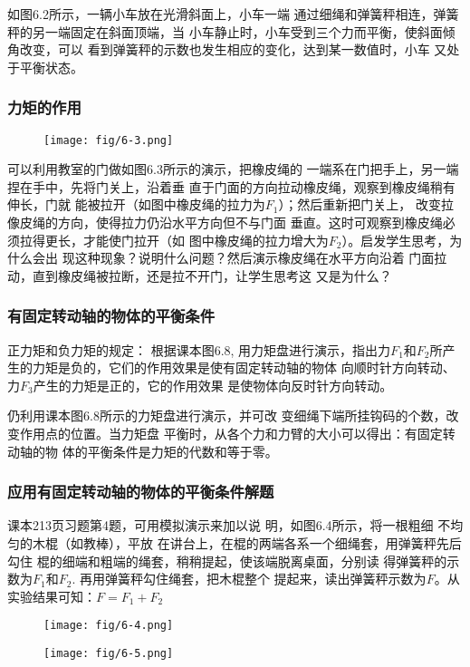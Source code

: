 如图6.2所示，一辆小车放在光滑斜面上，小车一端
通过细绳和弹簧秤相连，弹簧秤的另一端固定在斜面顶端，当
小车静止时，小车受到三个力而平衡，使斜面倾角改变，可以
看到弹簧秤的示数也发生相应的变化，达到某一数值时，小车
又处于平衡状态。



\subsubsection{力矩的作用}

\begin{figure}[htp]
    \centering
    \texttt{[image: fig/6-3.png]}
    \caption{}
\end{figure}

可以利用教室的门做如图6.3所示的演示，把橡皮绳的
一端系在门把手上，另一端捏在手中，先将门关上，沿着垂
直于门面的方向拉动橡皮绳，观察到橡皮绳稍有伸长，门就
能被拉开（如图中橡皮绳的拉力为$F_1$）；然后重新把门关上，
改变拉像皮绳的方向，使得拉力仍沿水平方向但不与门面
垂直。这时可观察到橡皮绳必须拉得更长，才能使门拉开（如
图中橡皮绳的拉力增大为$F_2$）。启发学生思考，为什么会出
现这种现象？说明什么问题？然后演示橡皮绳在水平方向沿着
门面拉动，直到橡皮绳被拉断，还是拉不开门，让学生思考这
又是为什么？

\subsubsection{有固定转动轴的物体的平衡条件}
正力矩和负力矩的规定：
根据课本图6.8, 用力矩盘进行演示，指出力$F_1$和$F_2$所产
生的力矩是负的，它们的作用效果是使有固定转动轴的物体
向顺时针方向转动、力$F_3$产生的力矩是正的，它的作用效果
是使物体向反时针方向转动。

仍利用课本图6.8所示的力矩盘进行演示，并可改
变细绳下端所挂钩码的个数，改变作用点的位置。当力矩盘
平衡时，从各个力和力臂的大小可以得出：有固定转动轴的物
体的平衡条件是力矩的代数和等于零。

\subsubsection{应用有固定转动轴的物体的平衡条件解题}
课本213页习题第4题，可用模拟演示来加以说
明，如图6.4所示，将一根粗细
不均匀的木棍（如教棒），平放
在讲台上，在棍的两端各系一个细绳套，用弹簧秤先后勾住
棍的细端和粗端的绳套，稍稍提起，使该端脱离桌面，分别读
得弹簧秤的示数为$F_1$和$F_2$. 再用弹簧秤勾住绳套，把木棍整个
提起来，读出弹簧秤示数为$F$。从实验结果可知：$F=F_1+F_2$
\begin{figure}[htp]\centering
    \begin{minipage}[t]{0.48\textwidth}
    \centering
    \texttt{[image: fig/6-4.png]}
    \caption{}
    \end{minipage}
    \begin{minipage}[t]{0.48\textwidth}
    \centering
    \texttt{[image: fig/6-5.png]}
    \caption{}
    \end{minipage}
    \end{figure}

